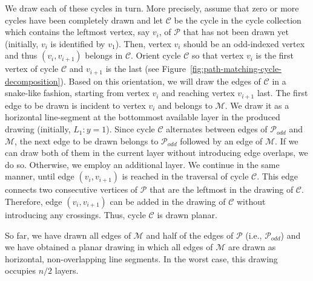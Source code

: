 \documentclass{llncs}
\begin{document}
We draw each of these cycles in turn. More precisely, assume that
zero or more cycles have been completely drawn and let $\mathcal{C}$
be the cycle in the cycle collection which contains the leftmost
vertex, say $v_i$, of $\mathcal{P}$ that has not been drawn yet
(initially, $v_i$ is identified by $v_1$). Then, vertex $v_i$ should
be an odd-indexed vertex and thus $(v_i,v_{i+1})$ belongs in
$\mathcal{C}$. Orient cycle $\mathcal{C}$ so that vertex $v_{i}$ is
the first vertex of cycle $\mathcal{C}$ and $v_{i+1}$ is the last
(see Figure~\ref{fig:path-matching-cycle-decomposition}). Based on
this orientation, we will draw the edges of $\mathcal{C}$ in a
snake-like fashion, starting from vertex $v_i$ and reaching vertex
$v_{i+1}$ last. The first edge to be drawn is incident to vertex
$v_i$ and belongs to $\mathcal{M}$. We draw it as a horizontal
line-segment at the bottommost available layer in the produced
drawing (initially, $L_1:y=1$). Since cycle $\mathcal{C}$ alternates
between edges of $\mathcal{P}_{odd}$ and $\mathcal{M}$, the next
edge to be drawn belongs to $\mathcal{P}_{odd}$ followed by an edge
of $\mathcal{M}$. If we can draw both of them in the current layer
without introducing edge overlaps, we do so. Otherwise, we employ an
additional layer. We continue in the same manner, until edge
$(v_i,v_{i+1})$ is reached in the traversal of cycle $\mathcal{C}$.
This edge connects two consecutive vertices of $\mathcal{P}$ that
are the leftmost in the drawing of $\mathcal{C}$. Therefore, edge
$(v_i,v_{i+1})$ can be added in the drawing of $\mathcal{C}$ without
introducing any crossings. Thus, cycle $\mathcal{C}$ is drawn
planar.

So far, we have drawn all edges of $\mathcal{M}$ and half of the
edges of $\mathcal{P}$ (i.e., $\mathcal{P}_{odd}$) and we have
obtained a planar drawing in which all edges of $\mathcal{M}$ are
drawn as horizontal, non-overlapping line segments. In the worst
case, this drawing occupies $n/2$ layers.
\end{document}
